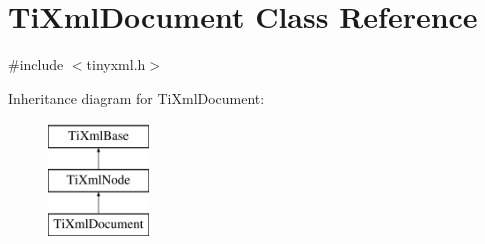 \hypertarget{classTiXmlDocument}{\section{Ti\-Xml\-Document Class Reference}
\label{classTiXmlDocument}
}


{\ttfamily \#include $<$tinyxml.\-h$>$}

Inheritance diagram for Ti\-Xml\-Document\-:\begin{figure}[H]
\begin{center}
\leavevmode
\includegraphics[height=3.000000cm]{classTiXmlDocument}
\end{center}
\end{figure}
